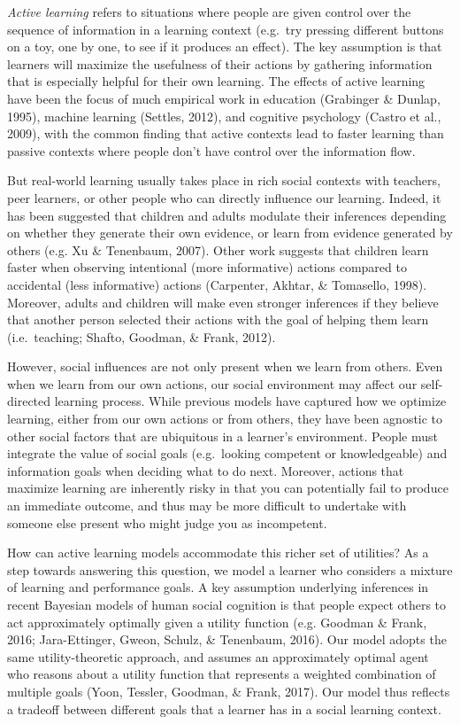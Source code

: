 \documentclass[10pt, letterpaper]{article}
\begin{document}
\emph{Active learning} refers to situations where people are given
control over the sequence of information in a learning context (e.g.~try
pressing different buttons on a toy, one by one, to see if it produces
an effect). The key assumption is that learners will maximize the
usefulness of their actions by gathering information that is especially
helpful for their own learning. The effects of active learning have been
the focus of much empirical work in education (Grabinger \& Dunlap,
1995), machine learning (Settles, 2012), and cognitive psychology
(Castro et al., 2009), with the common finding that active contexts lead
to faster learning than passive contexts where people don't have control
over the information flow.

But real-world learning usually takes place in rich social contexts with
teachers, peer learners, or other people who can directly influence our
learning. Indeed, it has been suggested that children and adults
modulate their inferences depending on whether they generate their own
evidence, or learn from evidence generated by others (e.g. Xu \&
Tenenbaum, 2007). Other work suggests that children learn faster when
observing intentional (more informative) actions compared to accidental
(less informative) actions (Carpenter, Akhtar, \& Tomasello, 1998).
Moreover, adults and children will make even stronger inferences if they
believe that another person selected their actions with the goal of
helping them learn (i.e.~teaching; Shafto, Goodman, \& Frank, 2012).

However, social influences are not only present when we learn from
others. Even when we learn from our own actions, our social environment
may affect our self-directed learning process. While previous models
have captured how we optimize learning, either from our own actions or
from others, they have been agnostic to other social factors that are
ubiquitous in a learner's environment. People must integrate the value
of social goals (e.g.~looking competent or knowledgeable) and
information goals when deciding what to do next. Moreover, actions that
maximize learning are inherently risky in that you can potentially fail
to produce an immediate outcome, and thus may be more difficult to
undertake with someone else present who might judge you as incompetent.

How can active learning models accommodate this richer set of utilities?
As a step towards answering this question, we model a learner who
considers a mixture of learning and performance goals. A key assumption
underlying inferences in recent Bayesian models of human social
cognition is that people expect others to act approximately optimally
given a utility function (e.g. Goodman \& Frank, 2016; Jara-Ettinger,
Gweon, Schulz, \& Tenenbaum, 2016). Our model adopts the same
utility-theoretic approach, and assumes an approximately optimal agent
who reasons about a utility function that represents a weighted
combination of multiple goals (Yoon, Tessler, Goodman, \& Frank, 2017).
Our model thus reflects a tradeoff between different goals that a
learner has in a social learning context.
\end{document}
